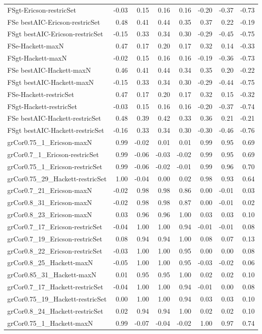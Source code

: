 {\begin{landscape}
\begin{footnotesize}
\begin{longtable}{@{}l|rrrrrrr@{}}
FSgt-Ericson-restricSet           & -0.03 & 0.15 & 0.16 & 0.16 & -0.20 & -0.37 & -0.73\tabularnewline
FSe bestAIC-Ericson-restricSet    & 0.48 & 0.41 & 0.44 & 0.35 & 0.37 & 0.22 & -0.19\tabularnewline
FSgt bestAIC-Ericson-restricSet   & -0.15 & 0.33 & 0.34 & 0.30 & -0.29 & -0.45 & -0.75\tabularnewline
FSe-Hackett-maxN                  & 0.47 & 0.17 & 0.20 & 0.17 & 0.32 & 0.14 & -0.33\tabularnewline
FSgt-Hackett-maxN                 & -0.02 & 0.15 & 0.16 & 0.16 & -0.19 & -0.36 & -0.73\tabularnewline
FSe bestAIC-Hackett-maxN          & 0.46 & 0.41 & 0.44 & 0.34 & 0.35 & 0.20 & -0.22\tabularnewline
FSgt bestAIC-Hackett-maxN         & -0.15 & 0.33 & 0.34 & 0.30 & -0.29 & -0.44 & -0.75\tabularnewline
FSe-Hackett-restricSet            & 0.47 & 0.17 & 0.20 & 0.17 & 0.32 & 0.15 & -0.32\tabularnewline
FSgt-Hackett-restricSet           & -0.03 & 0.15 & 0.16 & 0.16 & -0.20 & -0.37 & -0.74\tabularnewline
FSe bestAIC-Hackett-restricSet    & 0.48 & 0.39 & 0.42 & 0.33 & 0.36 & 0.21 & -0.21\tabularnewline
FSgt bestAIC-Hackett-restricSet   & -0.16 & 0.33 & 0.34 & 0.30 & -0.30 & -0.46 & -0.76\tabularnewline
grCor0.75\_1\_Ericson-maxN        & 0.99 & -0.02 & 0.01 & 0.01 & 0.99 & 0.95 & 0.69\tabularnewline
grCor0.7\_1\_Ericson-restricSet   & 0.99 & -0.06 & -0.03 & -0.02 & 0.99 & 0.95 & 0.69\tabularnewline
grCor0.75\_1\_Ericson-restricSet  & 0.99 & -0.06 & -0.02 & -0.01 & 0.99 & 0.96 & 0.70\tabularnewline
grCor0.75\_29\_Hackett-restricSet & 1.00 & -0.04 & 0.00 & 0.02 & 0.98 & 0.93 & 0.64\tabularnewline
grCor0.7\_21\_Ericson-maxN        & -0.02 & 0.98 & 0.98 & 0.86 & 0.00 & -0.01 & 0.03\tabularnewline
grCor0.8\_31\_Ericson-maxN        & -0.02 & 0.98 & 0.98 & 0.87 & 0.00 & -0.01 & 0.02\tabularnewline
grCor0.8\_23\_Ericson-maxN        & 0.03 & 0.96 & 0.96 & 1.00 & 0.03 & 0.03 & 0.10\tabularnewline
grCor0.7\_17\_Ericson-restricSet  & -0.04 & 1.00 & 1.00 & 0.94 & -0.01 & -0.01 & 0.08\tabularnewline
grCor0.7\_19\_Ericson-restricSet  & 0.08 & 0.94 & 0.94 & 1.00 & 0.08 & 0.07 & 0.13\tabularnewline
grCor0.8\_22\_Ericson-restricSet  & -0.03 & 1.00 & 1.00 & 0.95 & 0.00 & 0.00 & 0.08\tabularnewline
grCor0.8\_25\_Hackett-maxN        & -0.05 & 1.00 & 1.00 & 0.95 & -0.03 & -0.02 & 0.06\tabularnewline
grCor0.85\_31\_Hackett-maxN       & 0.01 & 0.95 & 0.95 & 1.00 & 0.02 & 0.02 & 0.10\tabularnewline
grCor0.7\_17\_Hackett-restricSet  & -0.04 & 1.00 & 1.00 & 0.94 & -0.01 & 0.00 & 0.08\tabularnewline
grCor0.75\_19\_Hackett-restricSet & 0.00 & 1.00 & 1.00 & 0.94 & 0.03 & 0.03 & 0.10\tabularnewline
grCor0.8\_24\_Hackett-restricSet  & 0.02 & 0.94 & 0.94 & 1.00 & 0.02 & 0.02 & 0.10\tabularnewline
grCor0.75\_1\_Hackett-maxN        & 0.99 & -0.07 & -0.04 & -0.02 & 1.00 & 0.97 & 0.74\tabularnewline

\end{longtable}
\end{footnotesize}
\end{landscape}}
